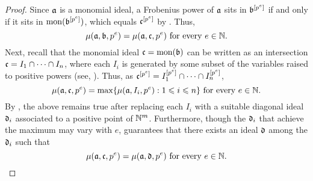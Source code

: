 \documentclass{amsart}
\begin{document}
\begin{proof}
   Since $\mathfrak{a}$ is a monomial ideal, a Frobenius power of $\mathfrak{a}$ sits in $\mathfrak{b}^{[p^e]}$ if and only if it sits in $\operatorname{mon}(\mathfrak{b}^{[p^e]})$, which equals $\mathfrak{c}^{[p^e]}$ by .
   Thus, \[\mu(\mathfrak{a}, \mathfrak{b}, p^e) = \mu(\mathfrak{a}, \mathfrak{c}, p^e)\text{ for every $e\in \mathbb{N}$.}\]
   Next, recall that the monomial ideal $\mathfrak{c} = \operatorname{mon}(\mathfrak{b})$ can be written as an intersection $\mathfrak{c} = I_1 \cap \cdots \cap I_n$, where each $I_i$ is generated by some subset of the variables raised to positive powers (see, \eg \cite[Lemma 5.18]{miller+sturmfels.combinatorial_CA}).
   Thus, as $\mathfrak{c}^{[p^e]} = I_1^{[p^e]} \cap \cdots \cap I_n^{[p^e]}$, 
   \[
      \mu(\mathfrak{a}, \mathfrak{c}, p^e) = \max\{\mu(\mathfrak{a}, I_i, p^e): 1\leqslant i\leqslant n\}\text{ for every $e\in \mathbb{N}$}.
   \]
   By , the above remains true after replacing each $I_i$ with a suitable diagonal ideal $\mathfrak{d}_i$ associated to a positive point of $\mathbb{N}^m$.
   Furthermore, though the $\mathfrak{d}_i$ that achieve the maximum may vary with $e$,  guarantees that there exists an ideal $\mathfrak{d}$ among the $\mathfrak{d}_i$ such that
   \[\mu(\mathfrak{a}, \mathfrak{c}, p^e) = \mu(\mathfrak{a}, \mathfrak{d}, p^e)\text{ for every $e\in \mathbb{N}$}.\qedhere\]
\end{proof}


\end{document}

